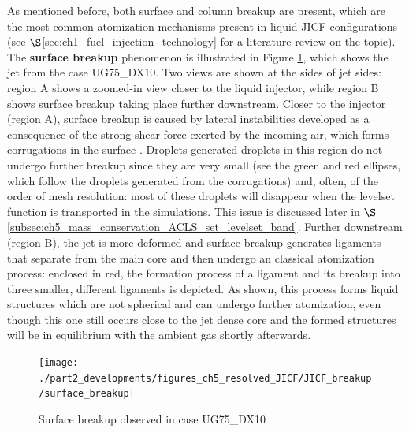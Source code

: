 As mentioned before, both surface and column breakup are present, which are the most common atomization mechanisms present in liquid JICF configurations (see $\S$\ref{sec:ch1_fuel_injection_technology} for a literature review on the topic). The \textbf{surface breakup} phenomenon is illustrated in Figure \ref{fig:jicf_surface_breakup_ug75_dx10}, which shows the jet from the case UG75\_DX10. Two views are shown at the sides of jet sides: region A shows a zoomed-in view closer to the liquid injector, while region B shows surface breakup taking place further downstream. Closer to the injector (region A), surface breakup is caused by lateral instabilities developed as a consequence of the strong shear force exerted by the incoming air, which forms corrugations in the surface . Droplets generated droplets in this region do not undergo further breakup since they are very small (see the green and red ellipses, which follow the droplets generated from the corrugations) and, often, of the order of mesh resolution: most of these droplets will disappear when the levelset function is transported in the simulations. This issue is discussed later in $\S$ \ref{subsec:ch5_mass_conservation_ACLS_set_levelset_band}. Further downstream (region B), the jet is more deformed and surface breakup generates ligaments that separate from the main core and then undergo an classical atomization process: enclosed in red, the formation process of a ligament and its breakup into three smaller, different ligaments is depicted. As shown, this process forms liquid structures which are not spherical and can undergo further atomization, even though this one still occurs close to the jet dense core and the formed structures will be in equilibrium with the ambient gas shortly afterwards.

\begin{figure}[ht]
\centering
\texttt{[image: ./part2\_developments/figures\_ch5\_resolved\_JICF/JICF\_breakup/surface\_breakup]}
\caption{Surface breakup observed in case UG75\_DX10}
\label{fig:jicf_surface_breakup_ug75_dx10}
\end{figure}

